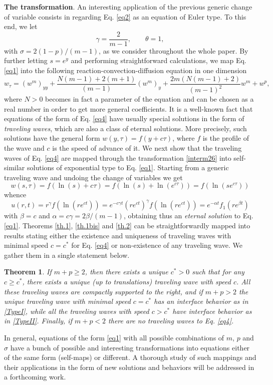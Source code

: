 \documentclass[a4paper,11pt]{article}
\newtheorem{theorem}{Theorem}[section]
\numberwithin{equation}{section}
\begin{document}
\noindent \textbf{The transformation}. An interesting application of the previous generic change of variable consists in regarding Eq. \eqref{eq2} as an equation of Euler type. To this end, we let
$$
\gamma=\frac{2}{m-1}, \qquad \theta=1,
$$
with $\sigma=2(1-p)/(m-1)$, as we consider throughout the whole paper. By further letting $s=e^y$ and performing straightforward calculations, we map Eq. \eqref{eq1} into the following reaction-convection-diffusion equation in one dimension
\begin{equation}\label{eq4}
w_\tau=(w^m)_{yy}+\frac{N(m-1)+2(m+1)}{(m-1)}(w^m)_y+\frac{2m(N(m-1)+2)}{(m-1)^2}w^m+w^p,
\end{equation}
where $N>0$ becomes in fact a parameter of the equation and can be chosen as a real number in order to get more general coefficients. It is a well-known fact that equations of the form of Eq. \eqref{eq4} have usually special solutions in the form of \emph{traveling waves}, which are also a class of eternal solutions. More precisely, such solutions have the general form $w(y,\tau)=f(y+c\tau)$, where $f$ is the profile of the wave and $c$ is the speed of advance of it. We next show that the traveling waves of Eq. \eqref{eq4} are mapped through the transformation \eqref{interm26} into self-similar solutions of exponential type to Eq. \eqref{eq1}. Starting from a generic traveling wave and undoing the change of variables we get
$$
w(s,\tau)=f(\ln(s)+c\tau)=f(\ln(s)+\ln(e^{c\tau}))=f(\ln(se^{c\tau}))
$$
whence
$$
u(r,t)=r^\gamma f(\ln(re^{ct}))=e^{-c\gamma t}(re^{ct})^\gamma f(\ln(re^{ct}))=e^{-\alpha t}f_1(re^{\beta t})
$$
with $\beta=c$ and $\alpha=c\gamma=2\beta/(m-1)$, obtaining thus an \emph{eternal solution} to Eq. \eqref{eq1}. Theorems \ref{th.1}, \ref{th.1bis} and \ref{th.2} can be straightforwardly mapped into results stating either the existence and uniqueness of traveling waves with minimal speed $c=c^*$ for Eq. \eqref{eq4} or non-existence of any traveling wave. We gather them in a single statement below.
\begin{theorem}\label{th.TW}
If $m+p\geq2$, then there exists a unique $c^*>0$ such that for any $c\geq c^*$, there exists a unique (up to translations) traveling wave with speed $c$. All these traveling waves are compactly supported to the right, and if $m+p>2$ the unique traveling wave with minimal speed $c=c^*$ has an interface behavior as in \eqref{TypeI}, while all the traveling waves with speed $c>c^*$ have interface behavior as in \eqref{TypeII}. Finally, if $m+p<2$ there are no traveling waves to Eq. \eqref{eq4}.
\end{theorem}
In general, equations of the form \eqref{eq1} with all possible combinations of $m$, $p$ and $\sigma$ have a bunch of possible and interesting transformations into equations either of the same form (self-maps) or different. A thorough study of such mappings and their applications in the form of new solutions and behaviors will be addressed in a forthcoming work.
\end{document}
